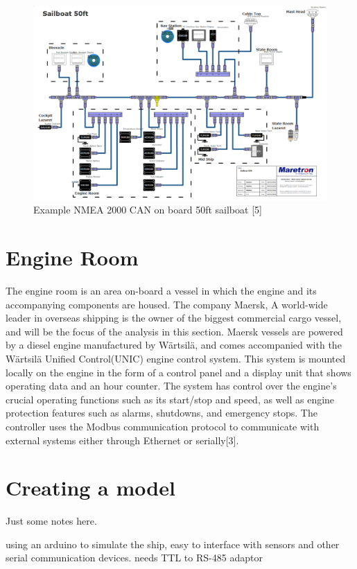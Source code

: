 \documentclass{article}
\begin{document}
\begin{figure}[h]
    \centering
    \includegraphics[width=12cm]{Images and Figures/NMEA2K.png}
    \caption{Example NMEA 2000 CAN on board 50ft sailboat   [5]}
    \label{fig:NMEA CAN}
\end{figure}




\section{Engine Room}
The engine room is an area on-board a vessel in which the engine and its accompanying components are housed. The company Maersk, A world-wide leader in overseas shipping is the owner of the biggest commercial cargo vessel, and will be the focus of the analysis in this section. Maersk vessels are powered by a diesel engine manufactured by Wärtsilä, and comes accompanied with the Wärtsilä Unified Control(UNIC) engine control system. This system is mounted locally on the engine in the form of a control panel and a display unit that shows operating data and an hour counter. The system has control over the engine's crucial operating functions such as its start/stop and  speed, as well as engine protection features such as alarms, shutdowns, and emergency stops. The controller uses the Modbus communication protocol to communicate with external systems either through Ethernet or serially[3]. 

\section{Creating a model}

Just some notes here.

using an arduino to simulate the ship, easy to interface with sensors and other serial communication devices. needs TTL to RS-485 adaptor 
\end{document}
